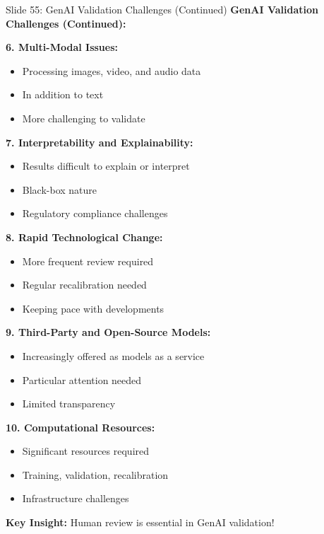 \documentclass[8pt]{beamer}
\begin{document}
	\begin{frame}{Slide 55: GenAI Validation Challenges (Continued)}
		\fontsize{6.5}{7.5}\selectfont
		\textbf{GenAI Validation Challenges (Continued):}
		
		\vspace{0.1cm}
		\textbf{6. Multi-Modal Issues:}
		\begin{itemize}
			\item Processing images, video, and audio data
			\item In addition to text
			\item More challenging to validate
		\end{itemize}
		
		\vspace{0.1cm}
		\textbf{7. Interpretability and Explainability:}
		\begin{itemize}
			\item Results difficult to explain or interpret
			\item Black-box nature
			\item Regulatory compliance challenges
		\end{itemize}
		
		\vspace{0.1cm}
		\textbf{8. Rapid Technological Change:}
		\begin{itemize}
			\item More frequent review required
			\item Regular recalibration needed
			\item Keeping pace with developments
		\end{itemize}
		
		\vspace{0.1cm}
		\textbf{9. Third-Party and Open-Source Models:}
		\begin{itemize}
			\item Increasingly offered as models as a service
			\item Particular attention needed
			\item Limited transparency
		\end{itemize}
		
		\vspace{0.1cm}
		\textbf{10. Computational Resources:}
		\begin{itemize}
			\item Significant resources required
			\item Training, validation, recalibration
			\item Infrastructure challenges
		\end{itemize}
		
		\textcolor{myblue}{\textbf{Key Insight:}} Human review is \textcolor{myblue}{essential in GenAI validation}!
	\end{frame}
	
\end{document}
